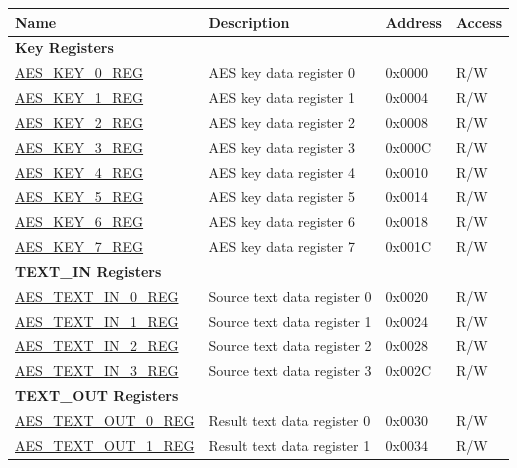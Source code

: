 \begin{longtable}{ | p{6cm} | p{7.2cm} | p{1.3cm} | p{1cm} | }
    \hline\rowcolor{lightgray}
    Name & Description &  Address & Access \\ \hline
    \endhead
    \multicolumn{4}{|l|}{\textbf{Key Registers}} \\ \hline
    \hyperref[regdesc:AESKEYnREG]{AES\_KEY\_0\_REG} & AES key data register 0 & 0x0000 & R/W \\ \hline
    \hyperref[regdesc:AESKEYnREG]{AES\_KEY\_1\_REG} & AES key data register 1 & 0x0004 & R/W \\ \hline
    \hyperref[regdesc:AESKEYnREG]{AES\_KEY\_2\_REG} & AES key data register 2 & 0x0008 & R/W \\ \hline
    \hyperref[regdesc:AESKEYnREG]{AES\_KEY\_3\_REG} & AES key data register 3 & 0x000C & R/W \\ \hline
    \hyperref[regdesc:AESKEYnREG]{AES\_KEY\_4\_REG} & AES key data register 4 & 0x0010 & R/W \\ \hline
    \hyperref[regdesc:AESKEYnREG]{AES\_KEY\_5\_REG} & AES key data register 5 & 0x0014 & R/W \\ \hline
    \hyperref[regdesc:AESKEYnREG]{AES\_KEY\_6\_REG} & AES key data register 6 & 0x0018 & R/W \\ \hline
    \hyperref[regdesc:AESKEYnREG]{AES\_KEY\_7\_REG} & AES key data register 7 & 0x001C & R/W \\ \hline
    \multicolumn{4}{|l|}{\textbf{TEXT\_IN Registers}} \\ \hline
    \hyperref[regdesc:AESTEXTINnREG]{AES\_TEXT\_IN\_0\_REG} & Source text data register 0 & 0x0020 & R/W \\ \hline
    \hyperref[regdesc:AESTEXTINnREG]{AES\_TEXT\_IN\_1\_REG} & Source text data register 1 & 0x0024 & R/W \\ \hline
    \hyperref[regdesc:AESTEXTINnREG]{AES\_TEXT\_IN\_2\_REG} & Source text data register 2 & 0x0028 & R/W \\ \hline
    \hyperref[regdesc:AESTEXTINnREG]{AES\_TEXT\_IN\_3\_REG} & Source text data register 3 & 0x002C & R/W \\ \hline
    \multicolumn{4}{|l|}{\textbf{TEXT\_OUT Registers}} \\ \hline
    \hyperref[regdesc:AESTEXTOUTnREG]{AES\_TEXT\_OUT\_0\_REG} & Result text data register 0 & 0x0030 & R/W \\ \hline
    \hyperref[regdesc:AESTEXTOUTnREG]{AES\_TEXT\_OUT\_1\_REG} & Result text data register 1 & 0x0034 & R/W \\ \hline

\end{longtable}
